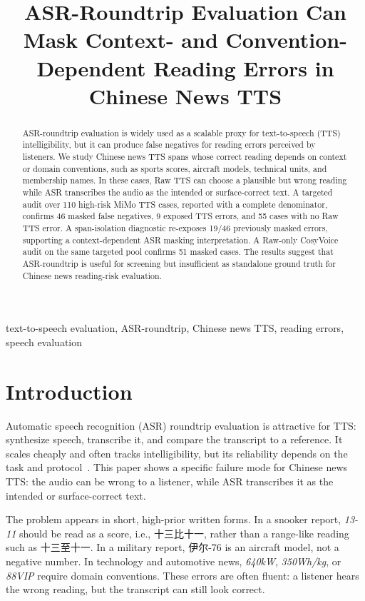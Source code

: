 \documentclass{article}
\title{ASR-Roundtrip Evaluation Can Mask Context- and Convention-Dependent Reading Errors in Chinese News TTS}
\begin{document}
\maketitle

\begin{abstract}
ASR-roundtrip evaluation is widely used as a scalable proxy for text-to-speech (TTS) intelligibility, but it can produce false negatives for reading errors perceived by listeners. We study Chinese news TTS spans whose correct reading depends on context or domain conventions, such as sports scores, aircraft models, technical units, and membership names. In these cases, Raw TTS can choose a plausible but wrong reading while ASR transcribes the audio as the intended or surface-correct text. A targeted audit over 110 high-risk MiMo TTS cases, reported with a complete denominator, confirms 46 masked false negatives, 9 exposed TTS errors, and 55 cases with no Raw TTS error. A span-isolation diagnostic re-exposes 19/46 previously masked errors, supporting a context-dependent ASR masking interpretation. A Raw-only CosyVoice audit on the same targeted pool confirms 51 masked cases. The results suggest that ASR-roundtrip is useful for screening but insufficient as standalone ground truth for Chinese news reading-risk evaluation.
\end{abstract}

\begin{keywords}
text-to-speech evaluation, ASR-roundtrip, Chinese news TTS, reading errors, speech evaluation
\end{keywords}

\section{Introduction}

Automatic speech recognition (ASR) roundtrip evaluation is attractive for TTS: synthesize speech, transcribe it, and compare the transcript to a reference. It scales cheaply and often tracks intelligibility, but its reliability depends on the task and protocol~\cite{taylor2021asr,favre2013asr}. This paper shows a specific failure mode for Chinese news TTS: the audio can be wrong to a listener, while ASR transcribes it as the intended or surface-correct text.

The problem appears in short, high-prior written forms. In a snooker report, \emph{13-11} should be read as a score, i.e., 十三比十一, rather than a range-like reading such as 十三至十一. In a military report, 伊尔-76 is an aircraft model, not a negative number. In technology and automotive news, \emph{640kW}, \emph{350Wh/kg}, or \emph{88VIP} require domain conventions. These errors are often fluent: a listener hears the wrong reading, but the transcript can still look correct.
\end{document}
